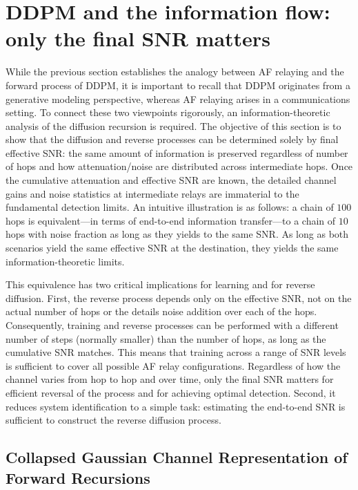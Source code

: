 \documentclass[journal]{IEEEtran}
\begin{document}
\section{DDPM and the information flow: only the final SNR matters}
While the previous section establishes the analogy between AF relaying and the forward process of DDPM, it is important to recall that DDPM originates from a generative modeling perspective, whereas AF relaying arises in a communications setting. 
To connect these two viewpoints rigorously, an information-theoretic analysis of the diffusion recursion is required. The objective of this section is to show that the diffusion and reverse processes can be determined solely by final effective SNR: the same amount of information is preserved regardless of number of hops and how attenuation/noise are distributed across intermediate hops. Once the cumulative attenuation and effective SNR are known, the detailed channel gains and noise statistics at intermediate relays are immaterial to the fundamental detection limits. An intuitive illustration is as follows: a chain of $100$ hops is 
equivalent—in terms of end-to-end information transfer—to a chain of $10$ hops with noise fraction as long as they yields to the same SNR. As long as both 
scenarios yield the same effective SNR at the destination, they yields the same information-theoretic limits.  

This equivalence has two critical implications for learning and for reverse diffusion. First, the reverse process 
depends only on the effective SNR, not on the actual number of hops or the details noise addition over each of the hops. Consequently, training and reverse processes can be performed with a 
different number of steps (normally smaller) than the number of hops, as long as the cumulative SNR matches. This means that training across a range of SNR levels is sufficient to cover all possible AF relay configurations. Regardless of how the channel varies from hop to hop and over time, only the final SNR matters for efficient reversal of the process and for achieving optimal detection. Second, 
it reduces system identification to a simple task: estimating the end-to-end SNR is sufficient to construct the 
reverse diffusion process.  





\subsection{Collapsed Gaussian Channel Representation of Forward Recursions}
\end{document}
